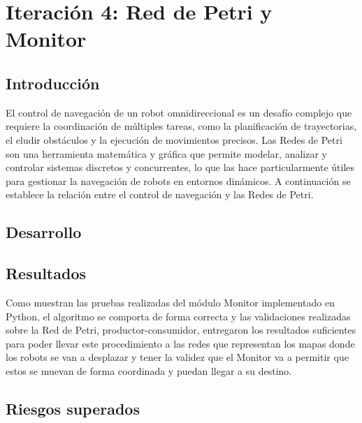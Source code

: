 \newpage
\section{Iteración 4: Red de Petri y Monitor}

\subsection{Introducción}
El control de navegación de un robot omnidireccional es un desafío complejo que requiere la coordinación de múltiples tareas, como la planificación de trayectorias, el eludir obstáculos y la ejecución de movimientos precisos. Las Redes de Petri son una herramienta matemática y gráfica que permite modelar, analizar y controlar sistemas discretos y concurrentes, lo que las hace particularmente útiles para gestionar la navegación de robots en entornos dinámicos. A continuación se establece la relación entre el control de navegación y las Redes de Petri.



\subsection{Desarrollo}









\subsection{Resultados}
Como muestran las pruebas realizadas del módulo Monitor implementado en Python, el algoritmo se comporta de forma correcta y las validaciones realizadas sobre la Red de Petri, productor-consumidor, entregaron los resultados suficientes para poder llevar este procedimiento a las redes que representan los mapas donde los robots se van a desplazar y tener la validez que el Monitor va a permitir que estos se muevan de forma coordinada y puedan llegar a su destino.

\subsection{Riesgos superados}

